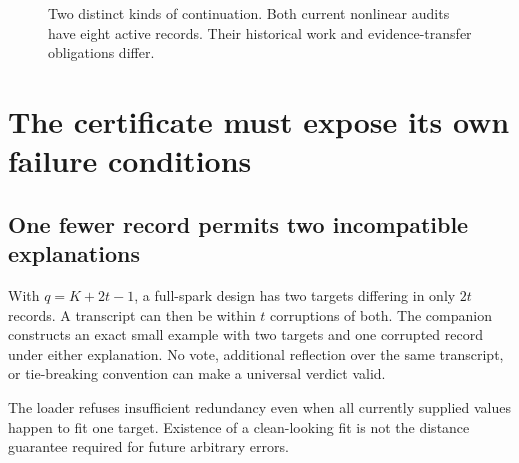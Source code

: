 \documentclass[11pt,letterpaper]{article}
\theoremstyle{remark}\newtheorem{remark}{Remark}[section]
\begin{document}
\begin{figure}[htbp]\centering
{}
\caption{Two distinct kinds of continuation. Both current nonlinear audits have eight active records. Their historical work and evidence-transfer obligations differ.}\label{fig:inherit}
\end{figure}

\section{The certificate must expose its own failure conditions}
\label{sec:limits}
\subsection{One fewer record permits two incompatible explanations}
With $q=K+2t-1$, a full-spark design has two targets differing in only $2t$ records. A transcript can then be within $t$ corruptions of both. The companion constructs an exact small example with two targets and one corrupted record under either explanation. No vote, additional reflection over the same transcript, or tie-breaking convention can make a universal verdict valid.

The loader refuses insufficient redundancy even when all currently supplied values happen to fit one target. Existence of a clean-looking fit is not the distance guarantee required for future arbitrary errors.
\end{document}
